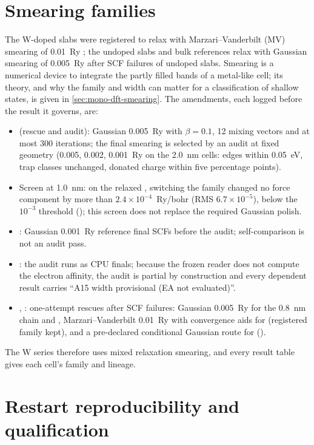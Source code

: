 \section{Smearing families}
\label{sec:mono-am-smearing}

The W-doped slabs were registered to relax with Marzari--Vanderbilt (MV) smearing of 0.01~Ry \citep{Marzari1999};
the undoped slabs and bulk references relax with Gaussian smearing of 0.005~Ry after SCF failures of undoped slabs.
Smearing is a numerical device to integrate the partly filled bands of a metal-like cell; its theory, and why the
family and width can matter for a classification of shallow states, is given in \cref{sec:mono-dft-smearing}. The
amendments, each logged before the result it governs, are:
\begin{itemize}
\item {} (rescue and audit): Gaussian 0.005~Ry with $\beta = 0.1$, 12 mixing vectors and at most 300
iterations; the final smearing is selected by an audit at fixed geometry (0.005, 0.002, 0.001~Ry on the 2.0~nm cells:
edges within 0.05~eV, trap classes unchanged, donated charge within five percentage points).
\item Screen at 1.0~nm: on the relaxed , switching the family changed no force component by more than
$2.4\times10^{-4}$~Ry/bohr (RMS $6.7\times10^{-5}$), below the $10^{-3}$ threshold (); this screen does not
replace the required Gaussian polish.
\item {}: Gaussian 0.001~Ry reference final SCFs before the audit; self-comparison is not an audit pass.
\item {}: the audit runs as CPU finals; because the frozen reader does not compute the electron affinity, the
audit is partial by construction and every dependent result carries ``A15 width provisional (EA not evaluated)''.
\item {}, : one-attempt rescues after SCF failures: Gaussian 0.005~Ry for the 0.8~nm chain and
, Marzari--Vanderbilt 0.01~Ry with convergence aids for  (registered family
kept), and a pre-declared conditional Gaussian route for  ().
\end{itemize}
The W series therefore uses mixed relaxation smearing, and every result table gives each cell's family and lineage.

\section{Restart reproducibility and qualification}
\label{sec:mono-am-restart}

